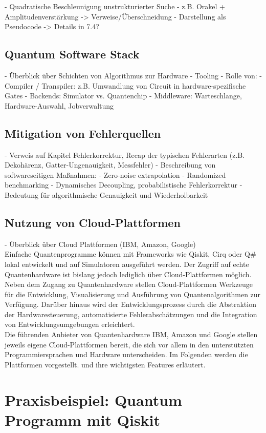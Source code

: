 - Quadratische Beschleunigung unstrukturierter Suche
- z.B. Orakel + Amplitudenverstärkung -> Verweise/Überschneidung
- Darstellung als Pseudocode -> Details in 7.4?

\subsection{Quantum Software Stack}

- Überblick über Schichten von Algorithmus zur Hardware
- Tooling
- Rolle von:
    - Compiler / Transpiler: z.B. Umwandlung von Circuit in hardware-spezifische Gates
    - Backends: Simulator vs. Quantenchip
    - Middleware: Warteschlange, Hardware-Auswahl, Jobverwaltung

\subsection{Mitigation von Fehlerquellen}

- Verweis auf Kapitel Fehlerkorrektur, Recap der typischen Fehlerarten (z.B. Dekohärenz, Gatter-Ungenauigkeit, Messfehler)
- Beschreibung von softwareseitigen Maßnahmen:
    - Zero-noise extrapolation
    - Randomized benchmarking
    - Dynamisches Decoupling, probabilistische Fehlerkorrektur
- Bedeutung für algorithmische Genauigkeit und Wiederholbarkeit

\subsection{Nutzung von Cloud-Plattformen}

- Überblick über Cloud Plattformen (IBM, Amazon, Google)
\\

Einfache Quantenprogramme können mit Frameworks wie Qiskit, Cirq oder Q\# lokal entwickelt und auf Simulatoren ausgeführt werden. Der Zugriff auf echte Quantenhardware ist bislang jedoch lediglich über Cloud-Plattformen möglich.
\\

Neben dem Zugang zu Quantenhardware stellen Cloud-Plattformen Werkzeuge für die Entwicklung, Visualisierung und Ausführung von Quantenalgorithmen zur Verfügung. Darüber hinaus wird der Entwicklungsprozess durch die Abstraktion der Hardwaresteuerung, automatisierte Fehlerabschätzungen und die Integration von Entwicklungsumgebungen erleichtert.
\\

Die führenden Anbieter von Quantenhardware IBM, Amazon und Google stellen jeweils eigene Cloud-Plattformen bereit, die sich vor allem in den unterstützten Programmiersprachen und Hardware unterscheiden. Im Folgenden werden die Plattformen vorgestellt. und ihre wichtigsten Features erläutert.

\section{Praxisbeispiel: Quantum Programm mit Qiskit}


\printbibliography
